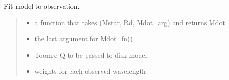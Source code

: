 \documentclass[a4paper,11pt,english]{sphinxmanual}
\begin{document}
\begin{fulllineitems}

\begin{fulllineitems}
\label{\detokenize{x22:disk_model.DiskFitting.evaluate_log_likelihood}}
\pysigstartsignatures
\pysiglinewithargsret
{}
{\sphinxparamcomma {}\sphinxparamcomma {}\sphinxparamcomma {}\sphinxparamcomma {}}
{}
\pysigstopsignatures
\end{fulllineitems}


\begin{fulllineitems}
\label{\detokenize{x22:disk_model.DiskFitting.fit}}
\pysigstartsignatures
\pysiglinewithargsret
{}
{\sphinxparamcomma {}\sphinxparamcomma {}\sphinxparamcomma {}\sphinxparamcomma {}}
{}
\pysigstopsignatures
\sphinxAtStartPar
Fit model to observation.
\begin{quote}\begin{description}
\begin{itemize}
\item {} 
\sphinxAtStartPar
{} \textendash{} a function that takes (Mstar, Rd, Mdot\_arg) and
returns Mdot

\item {} 
\sphinxAtStartPar
{} \textendash{} the last argument for Mdot\_fn()

\item {} 
\sphinxAtStartPar
{} \textendash{} Toomre Q to be passed to disk model

\item {} 
\sphinxAtStartPar
{} \textendash{} weights for each observed wavelength


\end{itemize}
\end{description}
\end{quote}
\end{fulllineitems}
\end{fulllineitems}
\end{document}
